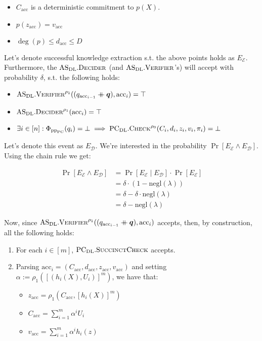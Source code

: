 \documentclass[
]{article}
\providecommand{\tightlist}{%
  \setlength{\itemsep}{0pt}\setlength{\parskip}{0pt}}
\newcommand*\Dc{\mathcal{D}}
\newcommand*\Ec{\mathcal{E}}
\renewcommand*\a{\alpha}
\renewcommand*\d{\delta}
\renewcommand*\l{\lambda}
\newcommand*\cat{\mathbin{+\mkern-10mu+}}
\renewcommand{\vec}[1]{ \boldsymbol{#1} }
\newcommand*{\negl}{\text{negl}}
\newcommand*{\pp}{\mathrm{pp}}
\newcommand*{\acc}{\mathrm{acc}}
\newcommand*{\PC}{\text{PC}}
\newcommand*{\PCDL}{\text{PC}_{\text{DL}}}
\newcommand*{\PCDLSuccinctCheck}{\PCDL.\mathrm{\text{S{\scriptsize UCCINCT}C{\scriptsize HECK}}}}
\newcommand*{\PCDLCheck}{\PCDL.\mathrm{\text{C\scriptsize HECK}}}
\newcommand*{\ASDL}{\text{AS}_{\text{DL}}}
\newcommand*{\ASDLVerifier}{\ASDL.\mathrm{\text{V\scriptsize ERIFIER}}}
\newcommand*{\ASDLDecider}{\ASDL.\mathrm{\text{D\scriptsize ECIDER}}}
\begin{document}
\begin{itemize}
\tightlist
\item
  \(C_\acc\) is a deterministic commitment to \(p(X)\).
\item
  \(p(z_\acc) = v_\acc\)
\item
  \(\deg(p) \leq d_\acc \leq D\)
\end{itemize}

Let's denote successful knowledge extraction s.t. the above points holds
as \(E_\Ec\). Furthermore, the \(\ASDLDecider\) (and
\(\ASDLVerifier\)'s) will accept with probability \(\d\), s.t. the
following holds:

\begin{itemize}
\tightlist
\item
  \(\ASDLVerifier^{\rho_1}((q_{\acc_{i-1}} \cat \vec{q}), \acc_i) = \top\)
\item
  \(\ASDLDecider^{\rho_1}(\acc_i) = \top\)
\item
  \(\exists i \in [n] : \Phi_{\pp_\PC}(q_i) = \bot \implies \PCDLCheck^{\rho_0}(C_i, d_i, z_i, v_i, \pi_i) = \bot\)
\end{itemize}

Let's denote this event as \(E_\Dc\). We're interested in the
probability \(\Pr[E_\Ec
\land E_\Dc]\). Using the chain rule we get:

\[
\begin{aligned}
  \Pr[E_\Ec \land E_\Dc] &= \Pr[E_\Ec \; | \; E_\Dc] \cdot \Pr[E_\Ec] \\
                         &= \d \cdot (1 - \negl(\l)) \\
                         &= \d - \d \cdot \negl(\l) \\
                         &= \d - \negl(\l)
\end{aligned}
\]

Now, since
\(\ASDLVerifier^{\rho_1}((q_{\acc_{i-1}} \cat \vec{q}), \acc_i)\)
accepts, then, by construction, all the following holds:

\begin{enumerate}
\def\labelenumi{\arabic{enumi}.}
\tightlist
\item
  For each \(i \in [m]\), \(\PCDLSuccinctCheck\) accepts.
\item
  Parsing \(\acc_i = (C_\acc, d_\acc, z_\acc, v_\acc)\) and setting
  \(\a := \rho_1([(h_i(X), U_i)]^m)\), we have that:

  \begin{itemize}
  \tightlist
  \item
    \(z_\acc = \rho_1(C_\acc, [h_i(X)]^m)\)
  \item
    \(C_\acc = \sum_{i=1}^m \alpha^i U_i\)
  \item
    \(v_\acc = \sum_{i=1}^m \alpha^i h_i(z)\)
  \end{itemize}
\end{enumerate}
\end{document}
